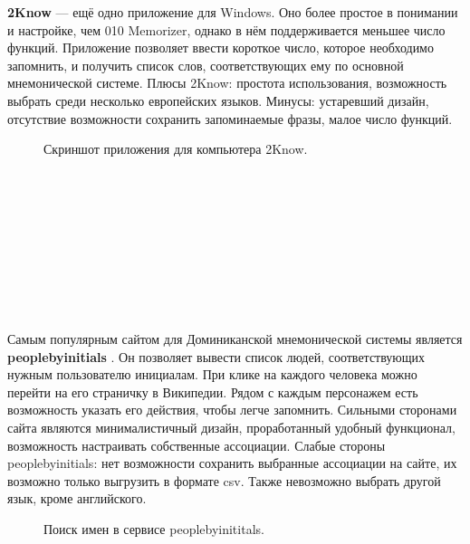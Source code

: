 \documentclass[draft]{article}
\begin{document}
\textbf{2Know} \cite{litlink7} — ещё одно приложение для Windows. Оно более простое в понимании и настройке, чем 010 Memorizer, однако в нём поддерживается меньшее число функций. Приложение позволяет ввести короткое число, которое необходимо запомнить, и получить список слов, соответствующих ему по основной мнемонической системе. Плюсы 2Know: простота использования, возможность выбрать среди несколько европейских языков. Минусы: устаревший дизайн, отсутствие возможности сохранить запоминаемые фразы, малое число функций.\\
\begin{figure}[h]
\caption{Скриншот приложения для компьютера 2Know.}
\label{ris:image}
\end{figure}\\
~\\
~\\
~\\
~\\
~\\
~\\
~\\
~\\
Самым популярным сайтом для Доминиканской мнемонической системы является \textbf{peoplebyinitials} \cite{litlink8}. Он позволяет вывести список людей, соответствующих нужным пользователю инициалам. При клике на каждого человека можно перейти на его страничку в Википедии. Рядом с каждым персонажем есть возможность указать его действия, чтобы легче запомнить. Сильными сторонами сайта являются минималистичный дизайн, проработанный удобный функционал, возможность настраивать собственные ассоциации. Слабые стороны peoplebyinitials: нет возможности сохранить выбранные ассоциации на сайте, их возможно только выгрузить в формате csv. Также невозможно выбрать другой язык, кроме английского.\\
\begin{figure}[h]
\caption{Поиск имен в сервисе peoplebyinititals.}
\label{ris:image}
\end{figure}\\
\end{document}
